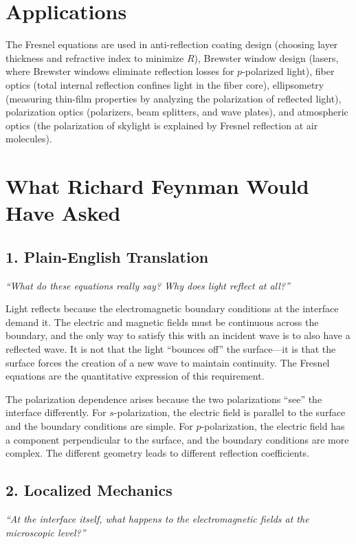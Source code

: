 \documentclass[11pt,openright]{book}
\begin{document}
\section*{Applications}

The Fresnel equations are used in anti-reflection coating design (choosing layer thickness and refractive index to minimize $R$), Brewster window design (lasers, where Brewster windows eliminate reflection losses for $p$-polarized light), fiber optics (total internal reflection confines light in the fiber core), ellipsometry (measuring thin-film properties by analyzing the polarization of reflected light), polarization optics (polarizers, beam splitters, and wave plates), and atmospheric optics (the polarization of skylight is explained by Fresnel reflection at air molecules).
\section*{What Richard Feynman Would Have Asked}

\subsection*{1. Plain-English Translation}
\textit{``What do these equations really say? Why does light reflect at all?''}

Light reflects because the electromagnetic boundary conditions at the interface demand it. The electric and magnetic fields must be continuous across the boundary, and the only way to satisfy this with an incident wave is to also have a reflected wave. It is not that the light ``bounces off'' the surface---it is that the surface forces the creation of a new wave to maintain continuity. The Fresnel equations are the quantitative expression of this requirement.

The polarization dependence arises because the two polarizations ``see'' the interface differently. For $s$-polarization, the electric field is parallel to the surface and the boundary conditions are simple. For $p$-polarization, the electric field has a component perpendicular to the surface, and the boundary conditions are more complex. The different geometry leads to different reflection coefficients.

\subsection*{2. Localized Mechanics}
\textit{``At the interface itself, what happens to the electromagnetic fields at the microscopic level?''}
\end{document}
